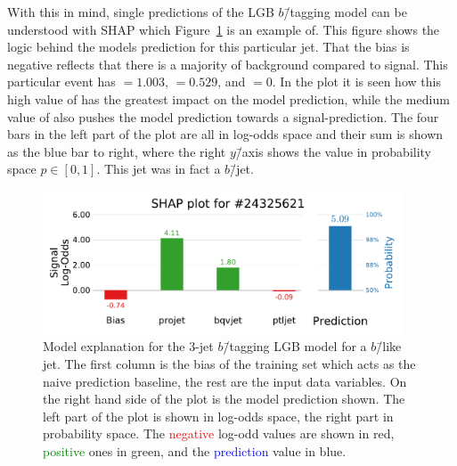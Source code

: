 With this in mind, single predictions of the LGB $b$\=/tagging model can be understood with SHAP which Figure~\ref{fig:q:shap_single_prediction_3j} is an example of. This figure shows the logic behind the models prediction for this particular jet. That the bias is negative reflects that there is a majority of background compared to signal. This particular event has $=1.003$, $=0.529$, and $=0$. In the plot it is seen how this high value of  has the greatest impact on the model prediction, while the medium value of  also pushes the model prediction towards a signal-prediction. The four bars in the left part of the plot are all in log-odds space and their sum is shown as the blue bar to right, where the right $y$\=/axis shows the value in probability space $p\in [0,1]$. This jet was in fact a $b$\=/jet.

\begin{figure}[h!]
  \centerfloat
  \includegraphics[width=0.95\textwidth, trim=0 0 0 40, clip]{figures/quarks/shap_values-down_sample=1.00-ML_vars=vertex-selection=b-ejet_min=4-n_iter_RS_lgb=99-n_iter_RS_xgb=9-cdot_cut=0.90-version=19-njet=3loc=24325621.pdf}
  \caption[SHAP 3-Jet Model Explanation for $b$\=/like Jet]
          {Model explanation for the 3-jet $b$\=/tagging LGB model for a $b$\=/like jet. The first column is the bias of the training set which acts as the naive prediction baseline, the rest are the input data variables. On the right hand side of the plot is the model prediction shown. The left part of the plot is shown in log-odds space, the right part in probability space. The \textcolor{red}{negative} log-odd values are shown in red, \textcolor{green}{positive} ones in green, and the \textcolor{blue}{prediction} value in blue. 
          } 
  \label{fig:q:shap_single_prediction_3j}
\end{figure}



